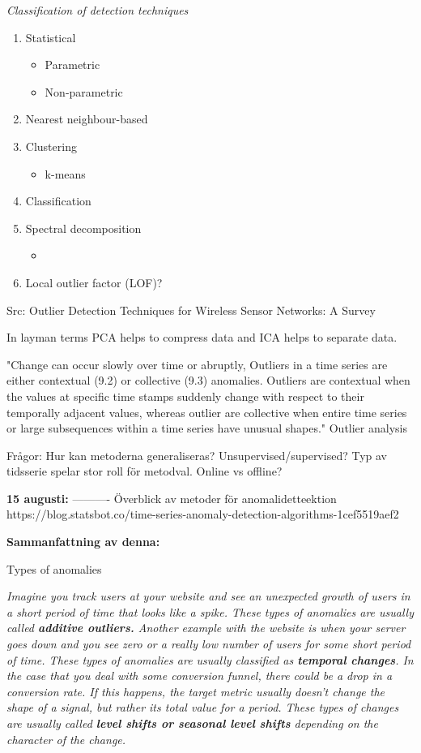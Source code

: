 \textit{Classification of detection techniques}
\begin{enumerate}
\item Statistical
\begin{itemize}
\item Parametric
\item Non-parametric 
\end{itemize}
\item Nearest neighbour-based
\item Clustering
\begin{itemize}
\item k-means
\end{itemize}
\item Classification
\item Spectral decomposition
\begin{itemize}
\item 
\end{itemize}
\item Local outlier factor (LOF)?	
\end{enumerate}
Src: Outlier Detection Techniques for Wireless Sensor Networks: A Survey

In layman terms PCA helps to compress data and ICA helps to separate data.

"Change can occur slowly over time or abruptly, Outliers in a time series are either contextual (9.2) or collective (9.3) anomalies. Outliers are contextual when the values at specific time stamps suddenly change with respect to their temporally adjacent values, whereas outlier are collective when entire time series or large subsequences within a time series have unusual shapes." Outlier analysis 

Frågor:
Hur kan metoderna generaliseras?
Unsupervised/supervised?
Typ av tidsserie spelar stor roll för metodval. 
Online vs offline?

\textbf{15 augusti:}
----------
Överblick av metoder för anomalidetteektion 
https://blog.statsbot.co/time-series-anomaly-detection-algorithms-1cef5519aef2

\textbf{Sammanfattning av denna:}

Types of anomalies

\textit{Imagine you track users at your website and see an unexpected growth of users in a short period of time that looks like a spike. These types of anomalies are usually called \textbf{additive outliers.}
Another example with the website is when your server goes down and you see zero or a really low number of users for some short period of time. These types of anomalies are usually classified as \textbf{temporal changes}.
In the case that you deal with some conversion funnel, there could be a drop in a conversion rate. If this happens, the target metric usually doesn’t change the shape of a signal, but rather its total value for a period. These types of changes are usually called \textbf{level shifts or seasonal level shifts} depending on the character of the change.}

